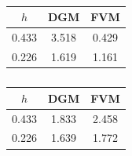 \begin{table}[h!]



\hspace{20mm}\begin{minipage}[t]{38mm} \small \centering

\caption{}\vspace{-3mm}

\begin{tabular}{c||c|c}

\hline \footnotesize $h$ & \footnotesize DGM & \footnotesize FVM \\

\hline\hline

\rule{0mm}{12pt}%

0{.}433 & 3{.}518 & 0{.}429 \\

0{.}226 & 1{.}619 & 1{.}161  \\

\hline

\end{tabular} \label{mas:tab2}

\end{minipage}



\vspace{-1.87cm}



\hspace{70mm}\begin{minipage}[t]{38mm} \small \centering

\caption{}\vspace{-3mm}

\begin{tabular}{c||c|c}

\hline \footnotesize $h$ & \footnotesize DGM & \footnotesize FVM \\

\hline\hline

\rule{0mm}{12pt}%

0{.}433 & 1{.}833 & 2{.}458 \\

0{.}226 & 1{.}639 & 1{.}772  \\

\hline

\end{tabular} \label{mas:tab3}

\end{minipage}






\end{table}





